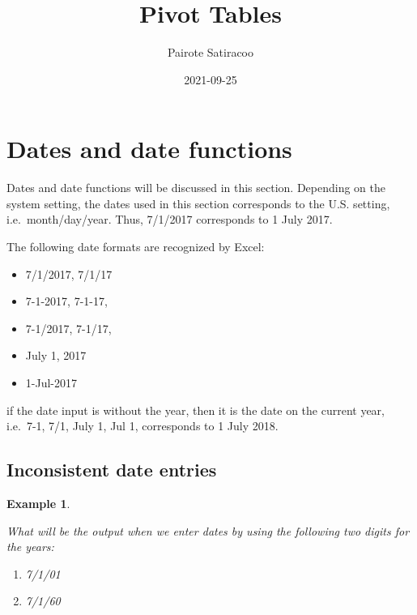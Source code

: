 \documentclass[
]{article}
\title{\textbf{Pivot Tables}}
\author{Pairote Satiracoo}
\date{2021-09-25}
\theoremstyle{definition}
\theoremstyle{definition}
\newtheorem{example}{Example}[section]
\theoremstyle{definition}
\theoremstyle{definition}
\theoremstyle{remark}
\begin{document}
\maketitle

{
\setcounter{tocdepth}{2}
\tableofcontents
}
\hypertarget{dates-and-date-functions}{%
\section{Dates and date functions}\label{dates-and-date-functions}}

Dates and date functions will be discussed in this section. Depending on
the system setting, the dates used in this section corresponds to the
U.S. setting, i.e.~month/day/year. Thus, 7/1/2017 corresponds to 1 July
2017.

The following date formats are recognized by Excel:

\begin{itemize}
\item
  7/1/2017, 7/1/17
\item
  7-1-2017, 7-1-17,
\item
  7-1/2017, 7-1/17,
\item
  July 1, 2017
\item
  1-Jul-2017
\end{itemize}

if the date input is without the year, then it is the date on the
current year, i.e.~7-1, 7/1, July 1, Jul 1, corresponds to 1 July 2018.

\hypertarget{inconsistent-date-entries}{%
\subsection{Inconsistent date entries}\label{inconsistent-date-entries}}

\begin{example}
\protect\hypertarget{exm:unlabeled-div-1}{}\label{exm:unlabeled-div-1}

\emph{What will be the output when we enter dates by using the
following two digits for the years:}

\begin{enumerate}
\def\labelenumi{\arabic{enumi}.}
\item
  \emph{7/1/01}
\item
  \emph{7/1/60}
\end{enumerate}

\end{example}
\end{document}
